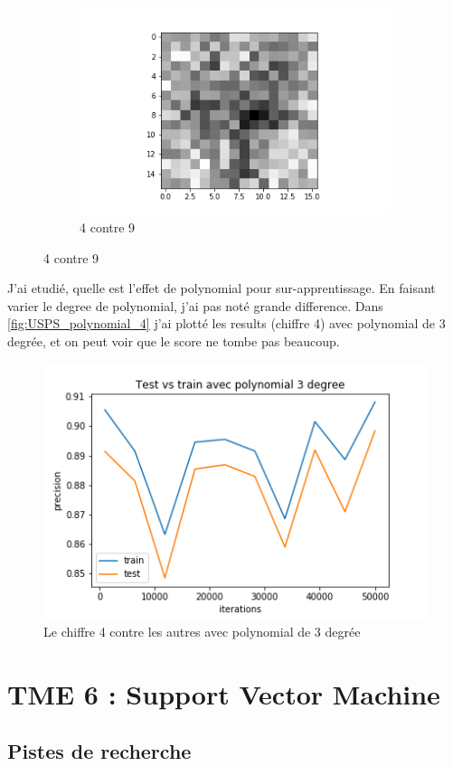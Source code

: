 \documentclass[a4paper,12pt]{article}
\begin{document}
\begin{figure}[h!]
\begin{subfigure}{.33\textwidth}
  \centering
	\includegraphics[width=\linewidth]{images/tme4/weight_w49.png}
	\caption{4 contre 9}
\end{subfigure}
\end{figure}

J'ai etudié, quelle est l'effet de polynomial pour sur-apprentissage. En faisant varier le degree de polynomial,
j'ai pas noté grande difference. Dans \autoref{fig:USPS_polynomial_4} j'ai plotté les results
 (chiffre 4)  avec polynomial de 3 degrée, et on peut voir que le score ne tombe pas beaucoup.

\begin{figure}[h!]
\caption{Le chiffre 4 contre les autres avec polynomial de 3 degrée}
\label{fig:USPS_polynomial_4}
\includegraphics[width=0.5\linewidth]{images/tme4/USPS_polynomial_4.png}
\centering
\end{figure}%



\section{TME 6 : Support Vector Machine}


\subsection{Pistes de recherche}



\end{document}

